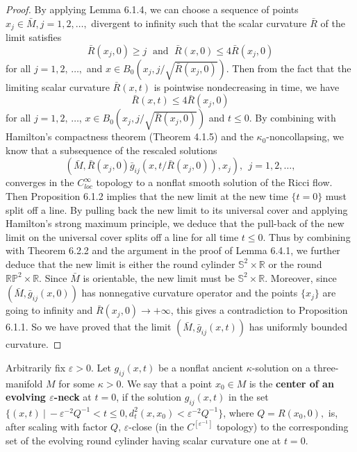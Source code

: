 \begin{proof}
By applying Lemma 6.1.4, we can choose a sequence of points $x_j
\in \bar{M}, j = 1, 2, \ldots,$ divergent to infinity such that
the scalar curvature $\bar{R}$ of the limit satisfies
$$
\bar{R}(x_j,0) \geq j\; \mbox{ and }\; \bar{R}(x,0) \leq
4\bar{R}(x_j,0)
$$
for all $j = 1, 2,\, \ldots,$ and $x\in
B_{0}(x_j,{j}/{\sqrt{\bar{R}(x_{j},0)}})$. Then from the fact that
the limiting scalar curvature $\bar{R}(x,t)$ is pointwise
nondecreasing in time, we have \begin{equation}
\bar{R}(x,t) \leq 4\bar{R}(x_j,0) %
\end{equation} for all $j = 1, 2,\, \ldots$, $x\in
B_{0}(x_j,{j}/{\sqrt{\bar{R}(x_{j},0)}})$ and $t\leq 0$. By
combining with Hamilton's compactness theorem (Theorem 4.1.5) and
the $\kappa_0$-noncollapsing, we know that a subsequence of the
rescaled solutions
$$
(\bar{M},\bar{R}(x_j,0)\bar{g}_{ij}(x, t/\bar{R}(x_j,0)),x_j), \ \
j=1, 2, \ldots,
$$
converges in the $C^{\infty}_{loc}$ topology to a nonflat smooth
solution of the Ricci flow. Then Proposition 6.1.2 implies that
the new limit at the new time $\{t = 0\}$ must split off a line.
By pulling back the new limit to its universal cover and applying
Hamilton's strong maximum principle, we deduce that the pull-back
of the new limit on the universal cover splits off a line for all
time $t \leq 0$. Thus by combining with Theorem 6.2.2 and the
argument in the proof of Lemma 6.4.1, we further deduce that the
new limit is either the round cylinder $\mathbb{S}^2 \times
\mathbb{R}$ or the round $\mathbb{R}\mathbb{P}^2 \times
\mathbb{R}$. Since $\bar{M}$ is orientable, the new limit must be
$\mathbb{S}^2 \times \mathbb{R}$. Moreover, since
$(\bar{M},\bar{g}_{ij}(x,0))$ has nonnegative curvature operator
and the points $\{ x_j \}$ are going to infinity and $
\bar{R}(x_j,0)\rightarrow +\infty $, this gives a contradiction to
Proposition 6.1.1. So we have proved that the limit
$(\bar{M},\bar{g}_{ij}(x,t))$ has uniformly bounded curvature.
\end{proof}

Arbitrarily fix $\varepsilon>0$. Let $g_{ij}(x,t)$ be a nonflat
ancient $\kappa$-solution on a three-manifold $M$ for some $\kappa
>0$. We say that a point $x_0\in M$ is the {\bf center of an
evolving $\varepsilon$-neck} at $t=0$, if the solution $g_{ij}(x,t)$ in the
set $\{(x,t)\ |\ -\varepsilon^{-2} Q^{-1}<t\le 0,
d_t^2(x,x_0)<\varepsilon^{-2} Q^{-1}\}$, where $Q=R(x_0,0),$ is,
after scaling with factor $Q$, $\varepsilon$-close (in the
$C^{[\varepsilon^{-1}]}$ topology) to the corresponding set of the
evolving round cylinder having scalar curvature one at $t=0$.

